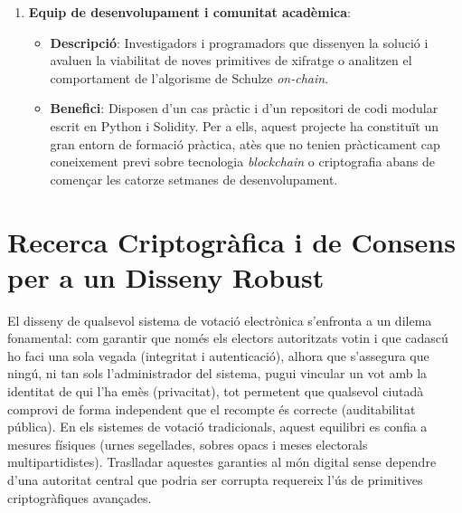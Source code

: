 \begin{enumerate}
\begin{itemize}
        \item \textbf{Benefici}: Reutilització d'aquesta tecnologia de codi obert per a organitzar els seus processos de
        presa de decisions interns a cost zero de desenvolupament, adaptant el disseny modular a les seves estructures
        de govern.
    \end{itemize}

    \item \textbf{Equip de desenvolupament i comunitat acadèmica}:
    \begin{itemize}
        \item \textbf{Descripció}: Investigadors i programadors que dissenyen la solució i avaluen la viabilitat de
        noves primitives de xifratge o analitzen el comportament de l'algorisme de Schulze \textit{on-chain}.

        \item \textbf{Benefici}: Disposen d'un cas pràctic i d'un repositori de codi modular escrit en Python i
        Solidity.
        Per a ells, aquest projecte ha constituït un gran entorn de formació pràctica, atès que no tenien pràcticament
        cap coneixement previ sobre tecnologia \textit{blockchain} o criptografia abans de començar les catorze setmanes
        de desenvolupament.
    \end{itemize}
\end{enumerate}


\section{Recerca Criptogràfica i de Consens per a un Disseny Robust}
\label{sec:recerca-criptografica}

El disseny de qualsevol sistema de votació electrònica s'enfronta a un dilema fonamental: com garantir que només els
electors autoritzats votin i que cadascú ho faci una sola vegada (integritat i autenticació), alhora que s'assegura que
ningú, ni tan sols l'administrador del sistema, pugui vincular un vot amb la identitat de qui l'ha emès (privacitat),
tot permetent que qualsevol ciutadà comprovi de forma independent que el recompte és correcte (auditabilitat pública).
En els sistemes de votació tradicionals, aquest equilibri es confia a mesures físiques (urnes segellades, sobres opacs i
meses electorals multipartidistes).
Traslladar aquestes garanties al món digital sense dependre d'una autoritat central que podria ser corrupta requereix
l'ús de primitives criptogràfiques avançades.


